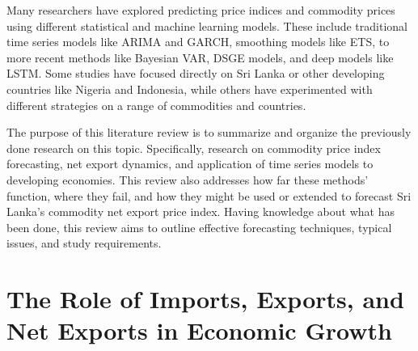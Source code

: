 \documentclass[12pt,a4paper]{report} %
\begin{document}
	Many researchers have explored predicting price indices and commodity prices using different statistical and machine learning models. These include traditional time series models like ARIMA and GARCH, smoothing models like ETS, to more recent methods like Bayesian VAR, DSGE models, and deep models like LSTM. Some studies have focused directly on Sri Lanka or other developing countries like Nigeria and Indonesia, while others have experimented with different strategies on a range of commodities and countries. 
	
	The purpose of this literature review is to summarize and organize the previously done research on this topic. Specifically, research on commodity price index forecasting, net export dynamics, and application of time series models to developing economies. This review also addresses how far these methods’ function, where they fail, and how they might be used or extended to forecast Sri Lanka's commodity net export price index. Having knowledge about what has been done, this review aims to outline effective forecasting techniques, typical issues, and study requirements. 
	
	\section{The Role of Imports, Exports, and Net Exports in Economic Growth}
	
\end{document}
